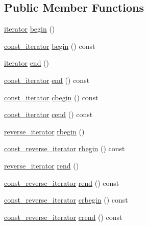 \subsection*{Public Member Functions}
\begin{DoxyCompactItemize}
\item 
\hyperlink{classVector_a45531016f99e90887e0f890f2da943e4}{iterator} \hyperlink{classVector_a466e8c045ea10d62c28b689888e9fe5a}{begin} ()
\item 
\hyperlink{classVector_a484e934cc06bb84c7d70042e792b6e55}{const\+\_\+iterator} \hyperlink{classVector_a514c5f6246f07f0012f1d00912838b19}{begin} () const
\item 
\hyperlink{classVector_a45531016f99e90887e0f890f2da943e4}{iterator} \hyperlink{classVector_ae288fa619188bff101d5300b8aaf9a90}{end} ()
\item 
\hyperlink{classVector_a484e934cc06bb84c7d70042e792b6e55}{const\+\_\+iterator} \hyperlink{classVector_a3f5f39e8ec9f506664b259299e79c485}{end} () const
\item 
\hyperlink{classVector_a484e934cc06bb84c7d70042e792b6e55}{const\+\_\+iterator} \hyperlink{classVector_afa15b0e58a9d29293941b3741a2ed1b5}{cbegin} () const
\item 
\hyperlink{classVector_a484e934cc06bb84c7d70042e792b6e55}{const\+\_\+iterator} \hyperlink{classVector_aab84ab1d529efc8949fb1891fe259f48}{cend} () const
\item 
\hyperlink{classVector_a6afe8339bd8b2187c173c0f46bbd7d63}{reverse\+\_\+iterator} \hyperlink{classVector_a72d1ce8358a966c55da760012fb9a68b}{rbegin} ()
\item 
\hyperlink{classVector_a963c193ac2399eed1cf20d74f559ef2a}{const\+\_\+reverse\+\_\+iterator} \hyperlink{classVector_a0a43fdc1d2f4b49ed085545e6e53a409}{rbegin} () const
\item 
\hyperlink{classVector_a6afe8339bd8b2187c173c0f46bbd7d63}{reverse\+\_\+iterator} \hyperlink{classVector_a74380623d29305cf5c9a544756672ef5}{rend} ()
\item 
\hyperlink{classVector_a963c193ac2399eed1cf20d74f559ef2a}{const\+\_\+reverse\+\_\+iterator} \hyperlink{classVector_a2749110ca7d7260fac6a1725e7fcbed1}{rend} () const
\item 
\hyperlink{classVector_a963c193ac2399eed1cf20d74f559ef2a}{const\+\_\+reverse\+\_\+iterator} \hyperlink{classVector_af5f7e3324c56c546c88099d12820c432}{crbegin} () const
\item 
\hyperlink{classVector_a963c193ac2399eed1cf20d74f559ef2a}{const\+\_\+reverse\+\_\+iterator} \hyperlink{classVector_a2b2998e97102c3750b0b556431b5b6b6}{crend} () const

\end{DoxyCompactItemize}
